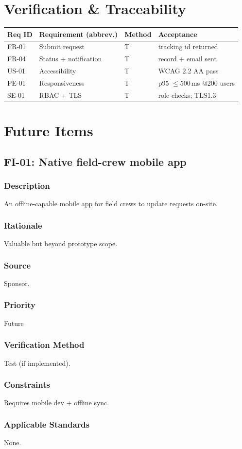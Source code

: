 \documentclass[11pt,letterpaper]{article}
\newcommand{\req}[7]{\subsubsection*{Description} #1 \subsubsection*{Rationale} #2
  \subsubsection*{Source} #3 \subsubsection*{Priority} #4
  \subsubsection*{Verification Method} #5 \subsubsection*{Constraints} #6
  \subsubsection*{Applicable Standards} #7}
\begin{document}
\section{Verification \& Traceability}
\begin{longtable}{ | p{1.4cm} | p{6.6cm} | p{1.4cm} | p{3cm} |}\hline
\textbf{Req ID} & \textbf{Requirement (abbrev.)} & \textbf{Method} & \textbf{Acceptance} \\ \hline\endhead
FR-01 & Submit request & T & tracking id returned \\ \hline
FR-04 & Status + notification & T & record + email sent \\ \hline
US-01 & Accessibility & T & WCAG 2.2 AA pass \\ \hline
PE-01 & Responsiveness & T & p95 $\leq$500\,ms @200 users \\ \hline
SE-01 & RBAC + TLS & T & role checks; TLS1.3 \\ \hline
\end{longtable}

\section{Future Items}
\subsection{FI-01: Native field-crew mobile app}
\req{An offline-capable mobile app for field crews to update requests on-site.}
{Valuable but beyond prototype scope.}
{Sponsor.}{Future}{Test (if implemented).}{Requires mobile dev + offline sync.}{None.}


{}
\end{document}
